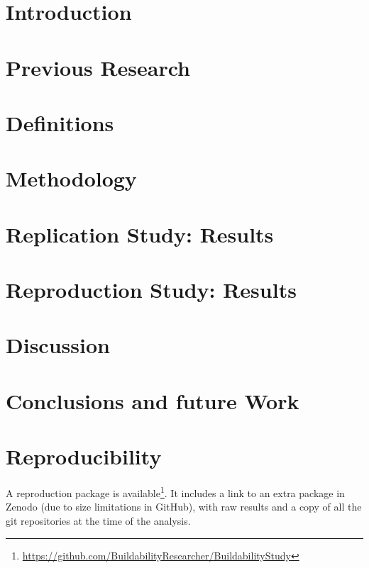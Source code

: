 \minitoc

\section{Introduction}
\label{sec:buildability:intro}


\section{Previous Research}
\label{sec:buildability:related}


\section{Definitions}
\label{sec:buildability:definitions}


\section{Methodology}
\label{sec:buildability:metodology}


\section{Replication Study: Results}
\label{sec:buildability:results-repli}


\section{Reproduction Study: Results}
\label{sec:buildability:results-repro}
 

\section{Discussion}
\label{sec:buildability:discussion}


\section{Conclusions and future Work}
\label{sec:buildability:conclusions}


\section*{Reproducibility}
\label{sec:buildability:repro}

A reproduction package is available\footnote{\url{https://github.com/BuildabilityResearcher/BuildabilityStudy}}. It includes a link to an extra package in Zenodo (due to size limitations in GitHub), with raw results and a copy of all the git repositories at the time of the analysis.

